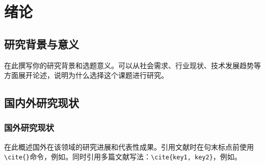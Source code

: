 \chapter{绪论}


%
%
%
%
%

\section{研究背景与意义}

在此撰写你的研究背景和选题意义。可以从社会需求、行业现状、技术发展趋势等方面展开论述，说明为什么选择这个课题进行研究\cite{example_book}。

\section{国内外研究现状}

\subsection{国外研究现状}

在此概述国外在该领域的研究进展和代表性成果。引用文献时在句末标点前使用\verb|\cite{}|命令，例如\cite{example_article}。同时引用多篇文献写法：\verb|\cite{key1, key2}|，例如\cite{example_article, example_conference}。


